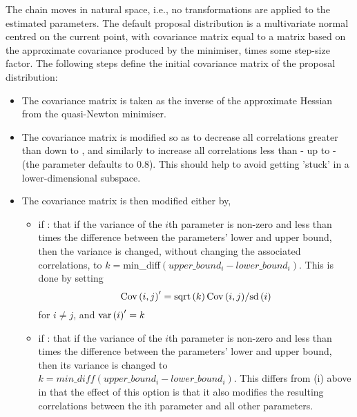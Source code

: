The chain moves in natural space, i.e., no transformations are applied to the estimated parameters. The default proposal distribution is a multivariate normal centred on the current point, with covariance matrix equal to a matrix based on the approximate covariance produced by the minimiser, times some step-size factor. The following steps define the initial covariance matrix of the proposal distribution: 

\begin{itemize}
\item The covariance matrix is taken as the inverse of the approximate Hessian from the quasi-Newton minimiser.

\item The covariance matrix is modified so as to decrease all correlations greater than  down to , and similarly to increase all correlations less than  - up to - (the  parameter defaults to 0.8). This should help to avoid getting 'stuck' in a lower-dimensional subspace.

\item The covariance matrix is then modified either by,

\begin{itemize}
\item if : that if the variance of the $i$th parameter is non-zero and less than  times the difference between the parameters' lower and upper bound, then the variance is changed, without changing the associated correlations, to $k=$min\_diff$(upper\_bound_i-lower\_bound_i)$. This is done by setting \[
{\mathop{\rm Cov}\nolimits} \left( {i,j} \right)^\prime   = {{{\mathop{\rm sqrt}\nolimits} \left( k \right){\mathop{\rm Cov}\nolimits} \left( {i,j} \right)} \mathord{\left/
{\vphantom {{{\mathop{\rm sqrt}\nolimits} \left( k \right){\mathop{\rm Cov}\nolimits} \left( {i,j} \right)} {{\mathop{\rm sd}\nolimits} \left( i \right)}}} \right.
\kern-\nulldelimiterspace} {{\mathop{\rm sd}\nolimits} \left( i \right)}}
\]
for $i \ne j$, and ${\mathop{\rm var}} \left( i \right)^\prime   = k$

\item if : that if the variance of the $i$th parameter is non-zero and less than  times the difference between the parameters' lower and upper bound, then its variance is changed to $k=min\_diff(upper\_bound_i-lower\_bound_i)$. This differs from (i) above in that the effect of this option is that it also modifies the resulting correlations between the ith parameter and all other parameters.
\end{itemize}


\end{itemize}
